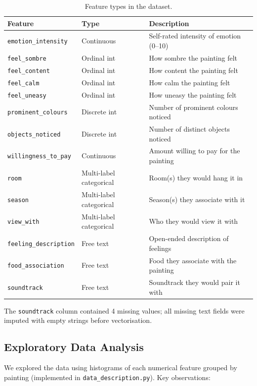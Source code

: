\documentclass[11pt,letterpaper]{article}
\begin{document}
\begin{table}[H]
\centering
\caption{Feature types in the dataset.}
\begin{tabular}{lll}
\toprule
\textbf{Feature} & \textbf{Type} & \textbf{Description}\\
\midrule
\texttt{emotion\_intensity} & Continuous  & Self-rated intensity of emotion (0--10)\\
\texttt{feel\_sombre}       & Ordinal int & How sombre the painting felt\\
\texttt{feel\_content}      & Ordinal int & How content the painting felt\\
\texttt{feel\_calm}         & Ordinal int & How calm the painting felt\\
\texttt{feel\_uneasy}       & Ordinal int & How uneasy the painting felt\\
\texttt{prominent\_colours} & Discrete int& Number of prominent colours noticed\\
\texttt{objects\_noticed}   & Discrete int& Number of distinct objects noticed\\
\texttt{willingness\_to\_pay}& Continuous & Amount willing to pay for the painting\\
\midrule
\texttt{room}       & Multi-label categorical & Room(s) they would hang it in\\
\texttt{season}     & Multi-label categorical & Season(s) they associate with it\\
\texttt{view\_with} & Multi-label categorical & Who they would view it with\\
\midrule
\texttt{feeling\_description} & Free text & Open-ended description of feelings\\
\texttt{food\_association}    & Free text & Food they associate with the painting\\
\texttt{soundtrack}           & Free text & Soundtrack they would pair it with\\
\bottomrule
\end{tabular}
\end{table}

\noindent The \texttt{soundtrack} column contained 4 missing values; all missing
text fields were imputed with empty strings before vectorisation.

\subsection{Exploratory Data Analysis}

We explored the data using histograms of each numerical feature grouped by
painting (implemented in \texttt{data\_description.py}). Key observations:
\end{document}
